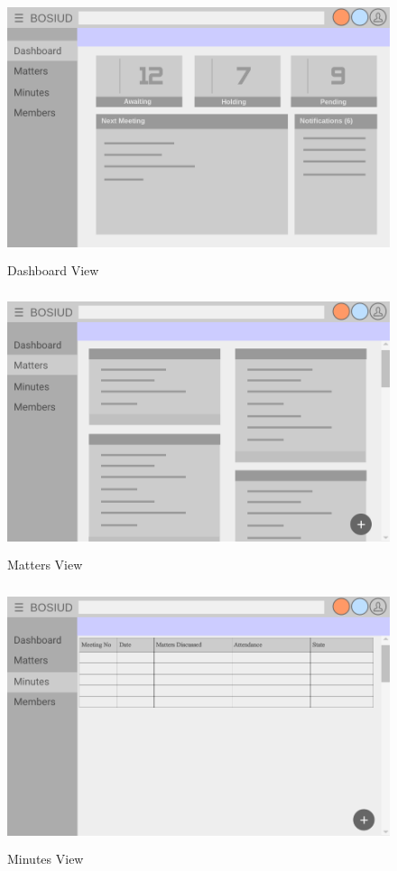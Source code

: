 \documentclass[a4paper,beamer]{article}
\begin{document}
		\vspace{1cm}
		\begin{figure}[h!]
			\begin{center}
			\includegraphics[width=5in,height=3in]{img/ui-dashboard}
			\end{center}
			\caption{Dashboard View}
			\label{fig:ui-dashboard}
		\end{figure}

		\begin{figure}[h!]
			\begin{center}
			\includegraphics[width=5in,height=3in]{img/ui-matters}
			\end{center}
			\caption{Matters View}
			\label{fig:ui-matters}
		\end{figure}

		\begin{figure}[h!]
			\begin{center}
			\includegraphics[width=5in,height=3in]{img/ui-minutes}
			\end{center}
			\caption{Minutes View}
			\label{fig:ui-minutes}
		\end{figure}
		
\end{document}
